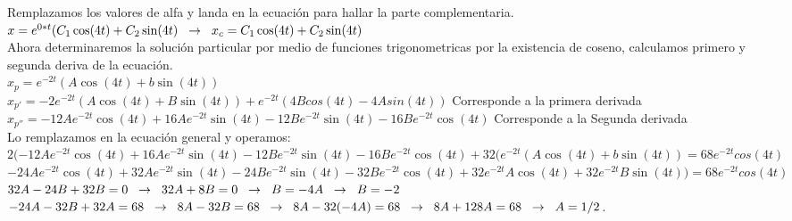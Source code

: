 \documentclass[12pt,a4paper]{article}
\begin{document}
Remplazamos los valores de alfa y landa en la ecuación para hallar la parte complementaria.\\

$x=e^{0*t }(C_{1}\cos(4 t)+C_{2}\sin(4 t)\hspace{0.2cm}\rightarrow\hspace{0.2cm}x_c=C_{1}\cos(4 t)+C_{2}\sin(4 t)$\\

Ahora determinaremos la solución particular por medio de funciones trigonometricas por la existencia de coseno, calculamos primero y segunda deriva de la ecuación.\\

$x_{p}=e^{-2t}(A\cos(4t)+b\sin(4t))$\\

$x_{p'}=-2e^{-2t}(A\cos(4t)+B\sin(4t))+e^{-2t}  (4B cos(4t)-4Asin(4t))$ Corresponde a la primera derivada\\  

$x_{p''}=-12Ae^{-2t}\cos \left(4t\right)+16Ae^{-2t}\sin \left(4t\right)-12Be^{-2t}\sin \left(4t\right)-16Be^{-2t}\cos \left(4t\right)$ Corresponde a la Segunda derivada\\

Lo remplazamos en la ecuación general y operamos:\\


$2(-12Ae^{-2t}\cos \left(4t\right)+16Ae^{-2t}\sin \left(4t\right)-12Be^{-2t}\sin \left(4t\right)-16Be^{-2t}\cos \left(4t\right)+32(e^{-2t}(A\cos(4t)+b\sin(4t))=68 e^{-2t} cos (4t)$\\

$-24Ae^{-2t}\cos \left(4t\right)+32Ae^{-2t}\sin \left(4t\right)-24Be^{-2t}\sin \left(4t\right)-32Be^{-2t}\cos \left(4t\right)+32e^{-2t}A\cos(4t)+32e^{-2t} B\sin(4t))=68 e^{-2t} cos (4t)$\\

$32A-24B+32B=0\hspace{0.2cm}\rightarrow\hspace{0.2cm}32A+8B=0\hspace{0.2cm}\rightarrow\hspace{0.2cm}B=-4A\hspace{0.2cm}\rightarrow\hspace{0.2cm}B=-2$\\

$-24A-32B+32A=68\hspace{0.2cm}\rightarrow\hspace{0.2cm}8A-32B=68\hspace{0.2cm}\rightarrow\hspace{0.2cm} 8A-32(-4A)=68\hspace{0.2cm}\rightarrow\hspace{0.2cm} 8A+128A=68\hspace{0.2cm}\rightarrow\hspace{0.2cm} A=1/2$.\\
\end{document}
